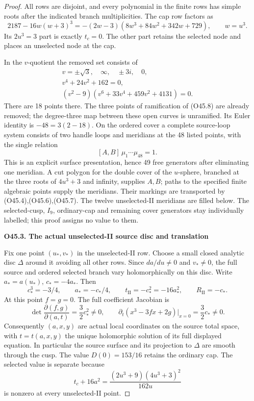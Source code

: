 \begin{proof}
All rows are disjoint, and every polynomial in the finite rows
has simple roots after the indicated branch multiplicities.
The cap row factors as
\[
 2187-16w(w+3)^3
 =-(2w-3)(8w^3+84w^2+342w+729),\qquad w=u^3.
 \tag{O45.11}
\]
Its \(2u^3=3\) part is exactly \(t_c=0\). The other part retains
the selected node and places an unselected node at the cap.

In the \(v\)-quotient the removed set consists of
\[
 \begin{gathered}
 v=\pm\sqrt3,\quad\infty,\quad\pm3i,\quad0,\\
 v^4+24v^2+162=0,\\
 (v^2-9)(v^6+33v^4+459v^2+4131)=0.
 \end{gathered}
\tag{O45.12}
\]
There are 18 points there. The three points of ramification
of (O45.8) are already removed; the degree-three map between
these open curves is unramified. Its Euler identity is
\(-48=3(2-18)\). On the ordered cover a complete source-loop
system consists of two handle loops and meridians at the 48
listed points, with the single relation
\[
 [A,B]\,\mu_1\cdots\mu_{48}=1.
 \tag{O45.13}
\]
This is an explicit surface presentation, hence 49 free
generators after eliminating one meridian. A cut polygon for
the double cover of the \(u\)-sphere, branched at the three
roots of \(4u^3+3\) and infinity, supplies \(A,B\); paths to
the specified finite algebraic points supply the meridians.
Their markings are transported by (O45.4),(O45.6),(O45.7).
The twelve unselected-II meridians are filled below. The
selected-cusp, \(I_9\), ordinary-cap and remaining cover
generators stay individually labelled; this proof assigns
no value to them.

\par

\medskip\noindent\textbf{O45.3. The actual unselected-II source disc and translation}

\par\nobreak

Fix one point \((u_*,v_*)\) in the unselected-II row. Choose
a small closed analytic disc \(\Delta\) around it avoiding
all other rows. Since \(da/du\ne0\) and \(v_*\ne0\), the
full source and ordered selected branch vary holomorphically
on this disc. Write \(a_*=a(u_*)\), \(c_*=-4a_*\). Then
\[
 c_*^3=-3/4,\qquad a_*=-c_*/4,\qquad
 t_{\mathrm{II}}=-c_*^2=-16a_*^2,\qquad R_{\mathrm{II}}=-c_*.
 \tag{O45.14}
\]
At this point \(f=g=0\). The full coefficient Jacobian is
\[
 \det\frac{\partial(f,g)}{\partial(a,t)}
 =\frac32c_*^2\ne0,\qquad
 \partial_t(x^3-3fx+2g)|_{x=0}=\frac32c_*\ne0.
 \tag{O45.15}
\]
Consequently \((a,x,y)\) are actual local coordinates on the
source total space, with \(t=t(a,x,y)\) the unique holomorphic
solution of its full displayed equation. In particular the
source surface and its projection to \(\Delta\) are smooth
through the cusp. The value \(D(0)=153/16\) retains the
ordinary cap. The selected value is separate because
\[
 t_c+16a^2=\frac{(2u^3+9)(4u^3+3)^2}{162u}
 \tag{O45.16}
\]
is nonzero at every unselected-II point.


\end{proof}
